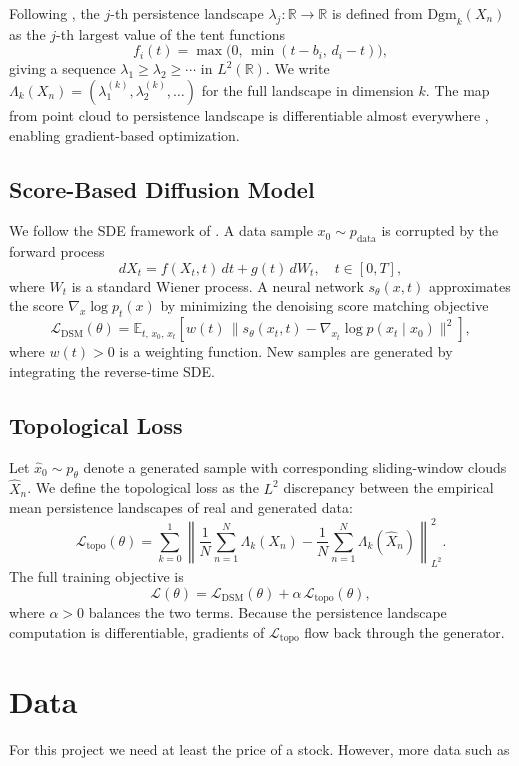 \documentclass{article}
\begin{document}
Following \cite{Bubenik_2015}, the $j$-th persistence landscape $\lambda_j : \mathbb{R} \to \mathbb{R}$ is defined from $\mathrm{Dgm}_k(X_n)$ as the $j$-th largest value of the tent functions
\[
    f_i(t) = \max\!\bigl(0,\, \min(t - b_i,\, d_i - t)\bigr),
\]
giving a sequence $\lambda_1 \geq \lambda_2 \geq \cdots$ in $L^2(\mathbb{R})$. We write $\Lambda_k(X_n) = (\lambda_1^{(k)}, \lambda_2^{(k)}, \dots)$ for the full landscape in dimension $k$. The map from point cloud to persistence landscape is differentiable almost everywhere \cite{Carriere_2021}, enabling gradient-based optimization.

\subsection*{Score-Based Diffusion Model}
We follow the SDE framework of \cite{Song_2021}. A data sample $x_0 \sim p_{\mathrm{data}}$ is corrupted by the forward process
\[
    dX_t = f(X_t, t)\,dt + g(t)\,dW_t, \quad t \in [0, T],
\]
where $W_t$ is a standard Wiener process. A neural network $s_\theta(x, t)$ approximates the score $\nabla_x \log p_t(x)$ by minimizing the denoising score matching objective
\[
    \mathcal{L}_{\mathrm{DSM}}(\theta) = \mathbb{E}_{t,\,x_0,\,x_t}\!\left[ w(t)\,\bigl\|s_\theta(x_t, t) - \nabla_{x_t} \log p(x_t \mid x_0)\bigr\|^2 \right],
\]
where $w(t) > 0$ is a weighting function. New samples are generated by integrating the reverse-time SDE.

\subsection*{Topological Loss}
Let $\hat{x}_0 \sim p_\theta$ denote a generated sample with corresponding sliding-window clouds $\hat{X}_n$. We define the topological loss as the $L^2$ discrepancy between the empirical mean persistence landscapes of real and generated data:
\[
    \mathcal{L}_{\mathrm{topo}}(\theta) = \sum_{k=0}^{1} \left\| \frac{1}{N}\sum_{n=1}^N \Lambda_k(X_n) - \frac{1}{N}\sum_{n=1}^N \Lambda_k(\hat{X}_n) \right\|_{L^2}^2.
\]
The full training objective is
\[
    \mathcal{L}(\theta) = \mathcal{L}_{\mathrm{DSM}}(\theta) + \alpha\,\mathcal{L}_{\mathrm{topo}}(\theta),
\]
where $\alpha > 0$ balances the two terms. Because the persistence landscape computation is differentiable, gradients of $\mathcal{L}_{\mathrm{topo}}$ flow back through the generator.

\section{Data}
For this project we need at least the price of a stock. However, more data such as 
\end{document}
